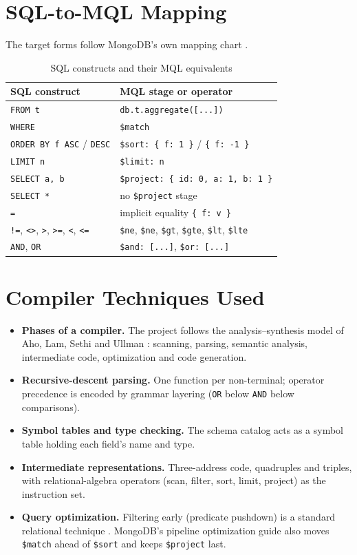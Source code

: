 \documentclass[12pt,a4paper]{report}
\newcommand{\codeus}{\textunderscore\allowbreak}
\DeclareRobustCommand{\code}[1]{\texttt{\let\_\codeus #1}}
\begin{document}
\section{SQL-to-MQL Mapping}
The target forms follow MongoDB's own mapping chart \cite{mongo-chart}.
\begin{table}[H]
\centering\small
\begin{tabular}{|l|l|}
\hline
\textbf{SQL construct} & \textbf{MQL stage or operator} \\ \hline
\code{FROM t} & \code{db.t.aggregate([...])} \\ \hline
\code{WHERE} & \code{\$match} \\ \hline
\code{ORDER BY f ASC} / \code{DESC} & \code{\$sort: \{ f: 1 \}} / \code{\{ f: -1 \}} \\ \hline
\code{LIMIT n} & \code{\$limit: n} \\ \hline
\code{SELECT a, b} & \code{\$project: \{ \_id: 0, a: 1, b: 1 \}} \\ \hline
\code{SELECT *} & no \code{\$project} stage \\ \hline
\code{=} & implicit equality \code{\{ f: v \}} \\ \hline
\code{!=}, \code{<>}, \code{>}, \code{>=}, \code{<}, \code{<=} & \code{\$ne}, \code{\$ne}, \code{\$gt}, \code{\$gte}, \code{\$lt}, \code{\$lte} \\ \hline
\code{AND}, \code{OR} & \code{\$and: [...]}, \code{\$or: [...]} \\ \hline
\end{tabular}
\caption{SQL constructs and their MQL equivalents}
\end{table}

\section{Compiler Techniques Used}
\begin{itemize}
  \item \textbf{Phases of a compiler.} The project follows the analysis--synthesis model of Aho, Lam, Sethi and Ullman \cite{aho}: scanning, parsing, semantic analysis, intermediate code, optimization and code generation.
  \item \textbf{Recursive-descent parsing.} One function per non-terminal; operator precedence is encoded by grammar layering (\code{OR} below \code{AND} below comparisons).
  \item \textbf{Symbol tables and type checking.} The schema catalog acts as a symbol table holding each field's name and type.
  \item \textbf{Intermediate representations.} Three-address code, quadruples and triples, with relational-algebra operators \cite{codd} (scan, filter, sort, limit, project) as the instruction set.
  \item \textbf{Query optimization.} Filtering early (predicate pushdown) is a standard relational technique \cite{selinger}. MongoDB's pipeline optimization guide \cite{mongo-opt} also moves \code{\$match} ahead of \code{\$sort} and keeps \code{\$project} last.
\end{itemize}
\end{document}
